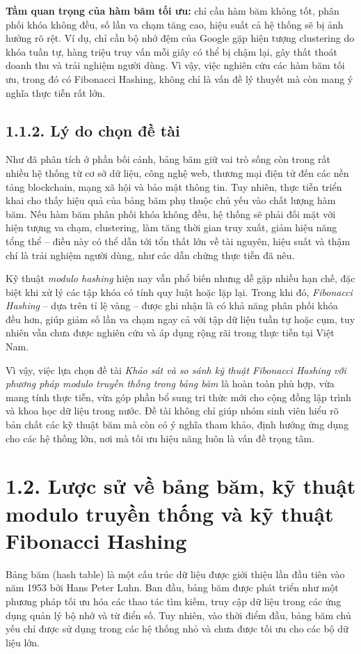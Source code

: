 \documentclass[12pt,a4paper]{report}
\begin{document}
\textbf{Tầm quan trọng của hàm băm tối ưu:} chỉ cần hàm băm không tốt, phân phối khóa không đều, số lần va chạm tăng cao, hiệu suất cả hệ thống sẽ bị ảnh hưởng rõ rệt. Ví dụ, chỉ cần bộ nhớ đệm của Google gặp hiện tượng clustering do khóa tuần tự, hàng triệu truy vấn mỗi giây có thể bị chậm lại, gây thất thoát doanh thu và trải nghiệm người dùng. Vì vậy, việc nghiên cứu các hàm băm tối ưu, trong đó có Fibonacci Hashing, không chỉ là vấn đề lý thuyết mà còn mang ý nghĩa thực tiễn rất lớn.

\subsection*{1.1.2. Lý do chọn đề tài}
\noindent \indent Như đã phân tích ở phần bối cảnh, bảng băm giữ vai trò sống còn trong rất nhiều hệ thống từ cơ sở dữ liệu, công nghệ web, thương mại điện tử đến các nền tảng blockchain, mạng xã hội và bảo mật thông tin. Tuy nhiên, thực tiễn triển khai cho thấy hiệu quả của bảng băm phụ thuộc chủ yếu vào chất lượng hàm băm. Nếu hàm băm phân phối khóa không đều, hệ thống sẽ phải đối mặt với hiện tượng va chạm, clustering, làm tăng thời gian truy xuất, giảm hiệu năng tổng thể – điều này có thể dẫn tới tổn thất lớn về tài nguyên, hiệu suất và thậm chí là trải nghiệm người dùng, như các dẫn chứng thực tiễn đã nêu.

Kỹ thuật \textit{modulo hashing} hiện nay vẫn phổ biến nhưng dễ gặp nhiều hạn chế, đặc biệt khi xử lý các tập khóa có tính quy luật hoặc lặp lại. Trong khi đó, \textit{Fibonacci Hashing }– dựa trên tỉ lệ vàng – được ghi nhận là có khả năng phân phối khóa đều hơn, giúp giảm số lần va chạm ngay cả với tập dữ liệu tuần tự hoặc cụm, tuy nhiên vẫn chưa được nghiên cứu và áp dụng rộng rãi trong thực tiễn tại Việt Nam.

Vì vậy, việc lựa chọn đề tài \textit{Khảo sát và so sánh kỹ thuật Fibonacci Hashing với phương pháp modulo truyền thống trong bảng băm} là hoàn toàn phù hợp, vừa mang tính thực tiễn, vừa góp phần bổ sung tri thức mới cho cộng đồng lập trình và khoa học dữ liệu trong nước. Đề tài không chỉ giúp nhóm sinh viên hiểu rõ bản chất các kỹ thuật băm mà còn có ý nghĩa tham khảo, định hướng ứng dụng cho các hệ thống lớn, nơi mà tối ưu hiệu năng luôn là vấn đề trọng tâm.



\section*{1.2. Lược sử về bảng băm, kỹ thuật modulo truyền thống và kỹ thuật Fibonacci Hashing}
\noindent \indent Bảng băm (hash table) là một cấu trúc dữ liệu được giới thiệu lần đầu tiên vào năm 1953 bởi Hans Peter Luhn. Ban đầu, bảng băm được phát triển như một phương pháp tối ưu hóa các thao tác tìm kiếm, truy cập dữ liệu trong các ứng dụng quản lý bộ nhớ và từ điển số. Tuy nhiên, vào thời điểm đầu, bảng băm chủ yếu chỉ được sử dụng trong các hệ thống nhỏ và chưa được tối ưu cho các bộ dữ liệu lớn.
\end{document}
